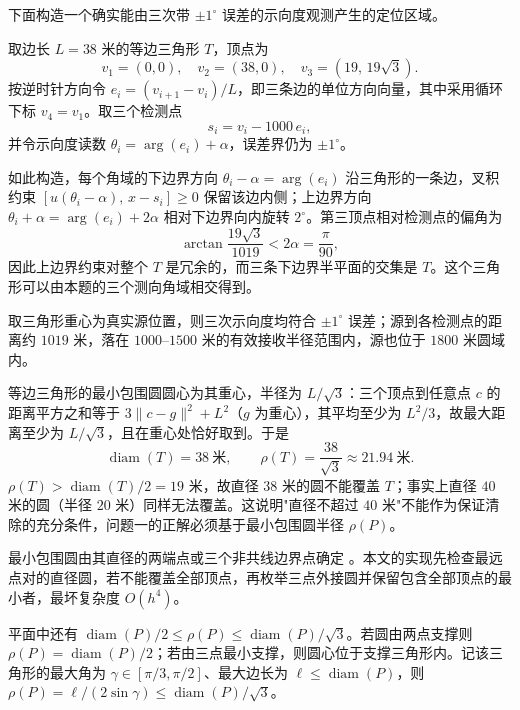\documentclass[UTF8,a4paper,zihao=-4,fontset=none]{ctexart}
\begin{document}
下面构造一个确实能由三次带 \(\pm1^\circ\) 误差的示向度观测产生的定位区域。

取边长 \(L=38\) 米的等边三角形 \(T\)，顶点为
\begin{equation}
  v_1=(0,0),\quad v_2=(38,0),\quad v_3=(19,\,19\sqrt3).
  \label{eq:triangle}
\end{equation}
按逆时针方向令 \(e_i=(v_{i+1}-v_i)/L\)，即三条边的单位方向向量，其中采用循环下标 \(v_4=v_1\)。取三个检测点
\begin{equation}
  s_i=v_i-1000\,e_i,
\end{equation}
并令示向度读数 \(\theta_i=\arg(e_i)+\alpha\)，误差界仍为 \(\pm1^\circ\)。

如此构造，每个角域的下边界方向 \(\theta_i-\alpha=\arg(e_i)\) 沿三角形的一条边，叉积约束 \([u(\theta_i-\alpha),\,x-s_i]\ge0\) 保留该边内侧；上边界方向 \(\theta_i+\alpha=\arg(e_i)+2\alpha\) 相对下边界向内旋转 \(2^\circ\)。第三顶点相对检测点的偏角为
\begin{equation}
  \arctan\frac{19\sqrt3}{1019}<2\alpha=\frac{\pi}{90},
\end{equation}
因此上边界约束对整个 \(T\) 是冗余的，而三条下边界半平面的交集是 \(T\)。这个三角形可以由本题的三个测向角域相交得到。

取三角形重心为真实源位置，则三次示向度均符合 \(\pm1^\circ\) 误差；源到各检测点的距离约 \(1019\) 米，落在 \(1000\)--\(1500\) 米的有效接收半径范围内，源也位于 \(1800\) 米圆域内。

等边三角形的最小包围圆圆心为其重心，半径为 \(L/\sqrt3\)：三个顶点到任意点 \(c\) 的距离平方之和等于 \(3\lVert c-g\rVert^2+L^2\)（\(g\) 为重心），其平均至少为 \(L^2/3\)，故最大距离至少为 \(L/\sqrt3\)，且在重心处恰好取到。于是
\begin{equation}
  \operatorname{diam}(T)=38\ \text{米},\qquad \rho(T)=\frac{38}{\sqrt3}\approx21.94\ \text{米}.
  \label{eq:counterexample}
\end{equation}
\(\rho(T)>\operatorname{diam}(T)/2=19\) 米，故直径 \(38\) 米的圆不能覆盖 \(T\)；事实上直径 \(40\) 米的圆（半径 \(20\) 米）同样无法覆盖。这说明"直径不超过 \(40\) 米"不能作为保证清除的充分条件，问题一的正解必须基于最小包围圆半径 \(\rho(P)\)。

最小包围圆由其直径的两端点或三个非共线边界点确定 \cite{Welzl1991}。本文的实现先检查最远点对的直径圆，若不能覆盖全部顶点，再枚举三点外接圆并保留包含全部顶点的最小者，最坏复杂度 \(O(h^4)\)。

平面中还有 \(\operatorname{diam}(P)/2\le\rho(P)\le\operatorname{diam}(P)/\sqrt3\)。若圆由两点支撑则 \(\rho(P)=\operatorname{diam}(P)/2\)；若由三点最小支撑，则圆心位于支撑三角形内。记该三角形的最大角为 \(\gamma\in[\pi/3,\pi/2]\)、最大边长为 \(\ell\le\operatorname{diam}(P)\)，则 \(\rho(P)=\ell/(2\sin\gamma)\le\operatorname{diam}(P)/\sqrt3\)。
\end{document}
